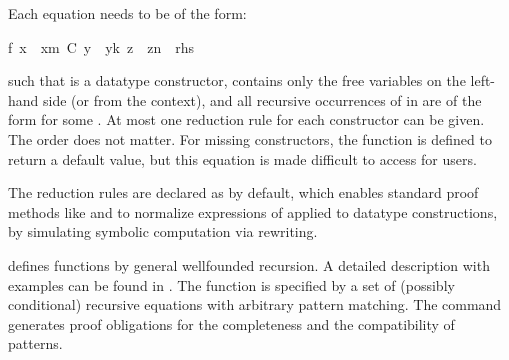 \begin{isabellebody}
\begin{isamarkuptext}
\begin{description}
  Each equation needs to be of the form:

  \begin{isabelle}%
{}f\ x\ {}\ x\isactrlsub m\ {}C\ y\ {}\ y\isactrlsub k{}\ z\ {}\ z\isactrlsub n\ {}\ rhs{}%
\end{isabelle}

  such that  is a datatype constructor,  contains
  only the free variables on the left-hand side (or from the context),
  and all recursive occurrences of  in  are of
  the form  for some .  At most one
  reduction rule for each constructor can be given.  The order does
  not matter.  For missing constructors, the function is defined to
  return a default value, but this equation is made difficult to
  access for users.

  The reduction rules are declared as \hyperlink{attribute.simp}{\mbox{}} by default,
  which enables standard proof methods like \hyperlink{method.simp}{\mbox{}} and
  \hyperlink{method.auto}{\mbox{}} to normalize expressions of  applied to
  datatype constructions, by simulating symbolic computation via
  rewriting.

  \item \hyperlink{command.HOL.function}{\mbox{}} defines functions by general
  wellfounded recursion. A detailed description with examples can be
  found in \cite{isabelle-function}. The function is specified by a
  set of (possibly conditional) recursive equations with arbitrary
  pattern matching. The command generates proof obligations for the
  completeness and the compatibility of patterns.


\end{description}
\end{isamarkuptext}
\end{isabellebody}
